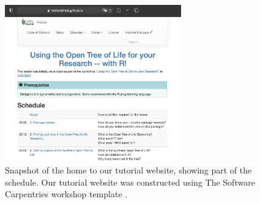 \documentclass[12pt]{article}
\begin{document}
\begin{figure}
\begin{center}
\includegraphics[width=3in]{fig-schedule.png}
\end{center}
\caption{Snapshot of the home to our tutorial website, showing part of the schedule.
 Our tutorial website was constructed using The Software Carpentries workshop template \citep{swc-workshop-template}. \label{fig:schedule}}
\end{figure}


\end{document}

